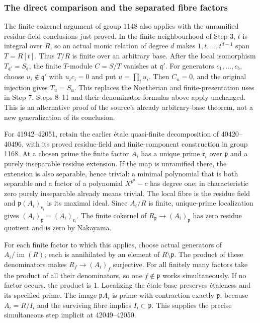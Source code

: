 \subsubsection{The direct comparison and the separated fibre factors}\label{algebra-proof-057-the-direct-comparison-and-the-separated-fibre-factors}

The finite-cokernel argument of group 1148 also applies with the unramified residue-field conclusions just proved. In the finite neighbourhood of Step 3, \(t\) is integral over \(R\), so an actual monic relation of degree \(d\) makes \(1,t,\ldots,t^{d-1}\) span \(T=R[t]\). Thus \(T/R\) is finite over an arbitrary base. After the local isomorphism \(T_{\mathfrak q'}=S_{\mathfrak q}\), the finite \(T\)-module \(C=S/T\) vanishes at \(\mathfrak q'\). For generators \(c_1,\ldots,c_b\), choose \(u_i\notin\mathfrak q'\) with \(u_i c_i=0\) and put \(u=\prod_i u_i\). Then \(C_u=0\), and the original injection gives \(T_u=S_u\). This replaces the Noetherian and finite-presentation uses in Step 7. Steps 8--11 and their denominator formulas above apply unchanged. This is an alternative proof of the source's already arbitrary-base theorem, not a new generalization of its conclusion.

For 41942--42051, retain the earlier étale quasi-finite decomposition of 40420--40496, with its proved residue-field and finite-component construction in group 1168. At a chosen prime the finite factor \(A_i\) has a unique prime \(\mathfrak r_i\) over \(\mathfrak p\) and a purely inseparable residue extension. If the map is unramified there, the extension is also separable, hence trivial: a minimal polynomial that is both separable and a factor of a polynomial \(X^{p^a}-c\) has degree one; in characteristic zero purely inseparable already means trivial. The local fibre is the residue field and \(\mathfrak p(A_i)_{\mathfrak r_i}\) is its maximal ideal. Since \(A_i/R\) is finite, unique-prime localization gives \((A_i)_{\mathfrak p}=(A_i)_{\mathfrak r_i}\). The finite cokernel of \(R_{\mathfrak p}\to(A_i)_{\mathfrak p}\) has zero residue quotient and is zero by Nakayama.

For each finite factor to which this applies, choose actual generators of \(A_i/\operatorname{im}(R)\); each is annihilated by an element of \(R\setminus\mathfrak p\). The product of these denominators makes \(R_f\to(A_i)_f\) surjective. For all finitely many factors take the product of all their denominators, so one \(f\notin\mathfrak p\) works simultaneously. If no factor occurs, the product is 1. Localizing the étale base preserves étaleness and its specified prime. The image \(\mathfrak pA_i\) is prime with contraction exactly \(\mathfrak p\), because \(A_i=R/I_i\) and the surviving fibre implies \(I_i\subset\mathfrak p\). This supplies the precise simultaneous step implicit at 42049--42050.

